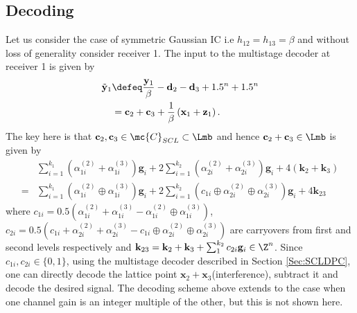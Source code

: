 \documentclass[conference]{IEEEtran}
\begin{document}
\subsection{Decoding}
Let us consider the case of symmetric Gaussian IC i.e $h_{12}=h_{13}=\beta$ and without loss of generality consider receiver 1. 
%
The input to the multistage decoder at receiver 1 is given by
\begin{align*}
\tilde{\mathbf{y}}_{1} &\defeq \frac{\mathbf{y}_{1}}{\beta}-\mathbf{d}_{2}-\mathbf{d}_{3}+1.5^{n}+1.5^{n}\\%
&=\mathbf{c}_{2}+\mathbf{c}_{3}+\frac{1}{\beta}\left(\mathbf{x}_{1}+\mathbf{z}_{1}\right).
\end{align*}
The key here is that $\mathbf{c}_{2},\mathbf{c}_{3}\in\mc{C}_{SCL}\subset\Lmb$ and hence $\mathbf{c}_{2}+\mathbf{c}_{3}\in \Lmb$ is given by
\begin{align*}
&\sum_{i=1}^{k_{1}}\left(\alpha_{1i}^{(2)}\!+\!\alpha_{1i}^{(3)}\right)\mathbf{g}_i\!+\!2\sum_{i=1}^{k_{2}}\left(\alpha_{2i}^{(2)}\!+\!\alpha_{2i}^{(3)}\right)\mathbf{g}_i +4(\mathbf{k}_{2}+\mathbf{k}_{3})\\
=&\sum_{i=1}^{k_{1}}\left(\alpha_{1i}^{(2)}\!\oplus\!\alpha_{1i}^{(3)}\right)\mathbf{g}_i+2\sum_{i=1}^{k_{2}}\left(c_{1i}\oplus\alpha_{2i}^{(2)}\oplus\alpha_{2i}^{(3)}\right)\mathbf{g}_i +4\mathbf{k}_{23}
\end{align*}
where $c_{1i}=0.5\left(\alpha_{1i}^{(2)}+\alpha_{1i}^{(3)}-\alpha_{1i}^{(2)}\oplus\alpha_{1i}^{(3)}\right)$, $c_{2i}=0.5\left(c_{1i}+\alpha_{2i}^{(2)}+\alpha_{2i}^{(3)}-c_{1i}\oplus\alpha_{2i}^{(2)}\oplus\alpha_{2i}^{(3)}\right)$ are carryovers from first and second levels respectively and
 $\mathbf{k}_{23}=\mathbf{k}_{2}+\mathbf{k}_{3}+\sum_{1}^{k_{2}}c_{2i}\mathbf{g}_{i}\in\Z^{n}$. Since $c_{1i}, c_{2i} \in \{0,1\}$, using the multistage decoder described in Section \ref{Sec:SCLDPC}, one can directly decode the lattice point $\mathbf{x}_{2}+\mathbf{x}_{3}$(interference), subtract it and decode the desired signal.
The decoding scheme above extends to the case when one channel gain is an integer multiple of the other, but this is not shown here.
\end{document}
